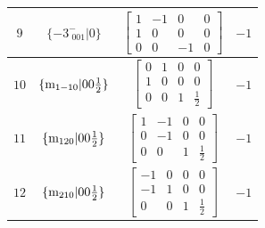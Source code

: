 \documentclass[fleqn,8pt]{jsarticle}
\begin{document}
\begin{longtable}{cccc}
$ 9 $ & $ \{-3^{-}_{\,\,001}|0\} $ & $ \begin{bmatrix} 1 & -1 & 0 & 0 \\ 1 & 0 & 0 & 0 \\ 0 & 0 & -1 & 0 \end{bmatrix} $ & $ -1 $ \\ \hline
$ 10 $ & $ \{{\rm m}_{1-10}|0 0 \frac{1}{2}\} $ & $ \begin{bmatrix} 0 & 1 & 0 & 0 \\ 1 & 0 & 0 & 0 \\ 0 & 0 & 1 & \frac{1}{2} \end{bmatrix} $ & $ -1 $ \\ \hline
$ 11 $ & $ \{{\rm m}_{120}|0 0 \frac{1}{2}\} $ & $ \begin{bmatrix} 1 & -1 & 0 & 0 \\ 0 & -1 & 0 & 0 \\ 0 & 0 & 1 & \frac{1}{2} \end{bmatrix} $ & $ -1 $ \\ \hline
$ 12 $ & $ \{{\rm m}_{210}|0 0 \frac{1}{2}\} $ & $ \begin{bmatrix} -1 & 0 & 0 & 0 \\ -1 & 1 & 0 & 0 \\ 0 & 0 & 1 & \frac{1}{2} \end{bmatrix} $ & $ -1 $ \\
\end{longtable}
\end{document}

